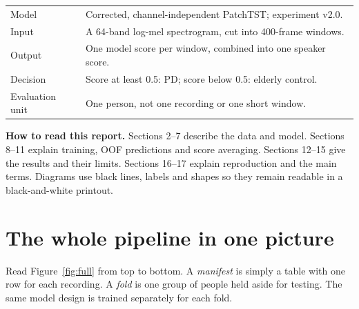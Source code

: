 \documentclass[11pt,a4paper]{article}
\newcommand{\key}[1]{\textbf{#1}}
\begin{document}
\begin{center}
\begin{tabularx}{\linewidth}{@{}L{3.3cm}Y@{}}
\toprule
Model & Corrected, channel-independent PatchTST; experiment v2.0.\\
Input & A 64-band log-mel spectrogram, cut into 400-frame windows.\\
Output & One model score per window, combined into one speaker score.\\
Decision & Score at least 0.5: PD; score below 0.5: elderly control.\\
Evaluation unit & One person, not one recording or one short window.\\
\bottomrule
\end{tabularx}
\end{center}

\key{How to read this report.} Sections 2--7 describe the data and model.
Sections 8--11 explain training, OOF predictions and score averaging.
Sections 12--15 give the results and their limits. Sections 16--17 explain
reproduction and the main terms. Diagrams use black lines, labels and shapes so
they remain readable in a black-and-white printout.

\clearpage
\section{The whole pipeline in one picture}
Read Figure~\ref{fig:full} from top to bottom. A \emph{manifest} is simply a table
with one row for each recording. A \emph{fold} is one group of people held aside
for testing. The same model design is trained separately for each fold.
\end{document}
